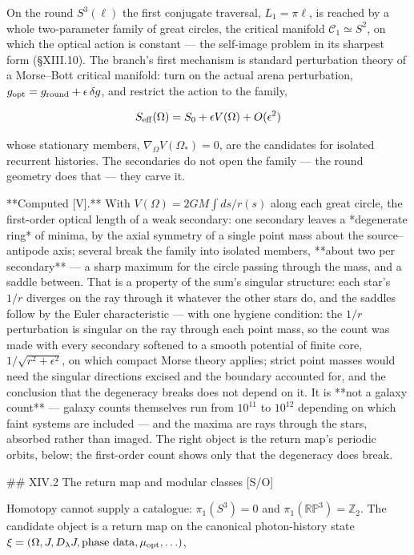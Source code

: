 On the round $S^3(\ell)$ the first conjugate traversal, $L_1 = \pi\ell$, is reached by a whole two-parameter family of great circles, the critical manifold $\mathcal C_1\simeq S^2$, on which the optical action is constant — the self-image problem in its sharpest form (§XIII.10). The branch's first mechanism is standard perturbation theory of a Morse–Bott critical manifold: turn on the actual arena perturbation, $g_{\rm opt} = g_{\rm round}+\epsilon\,\delta g$, and restrict the action to the family,

$$S_{\rm eff}(\Omega) = S_0+\epsilon V(\Omega)+O(\epsilon^2)$$

whose stationary members, $\nabla_\Omega V(\Omega_\ast) = 0$, are the candidates for isolated recurrent histories. The secondaries do not open the family — the round geometry does that — they carve it.

**Computed [V].** With $V(\Omega) = 2GM\int ds/r(s)$ along each great circle, the first-order optical length of a weak secondary: one secondary leaves a *degenerate ring* of minima, by the axial symmetry of a single point mass about the source–antipode axis; several break the family into isolated members, **about two per secondary** — a sharp maximum for the circle passing through the mass, and a saddle between. That is a property of the sum's singular structure: each star's $1/r$ diverges on the ray through it whatever the other stars do, and the saddles follow by the Euler characteristic — with one hygiene condition: the $1/r$ perturbation is singular on the ray through each point mass, so the count was made with every secondary softened to a smooth potential of finite core, $1/\sqrt{r^2+\epsilon^2}$, on which compact Morse theory applies; strict point masses would need the singular directions excised and the boundary accounted for, and the conclusion that the degeneracy breaks does not depend on it. It is **not a galaxy count** — galaxy counts themselves run from $10^{11}$ to $10^{12}$ depending on which faint systems are included — and the maxima are rays through the stars, absorbed rather than imaged. The right object is the return map's periodic orbits, below; the first-order count shows only that the degeneracy does break.

## XIV.2 The return map and modular classes [S/O]

Homotopy cannot supply a catalogue: $\pi_1(S^3) = 0$ and $\pi_1(\mathbb{RP}^3) = \mathbb Z_2$. The candidate object is a return map on the canonical photon-history state $\xi = (\Omega, J, D_\lambda J, \text{phase data}, \mu_{\rm opt},\ldots)$,

